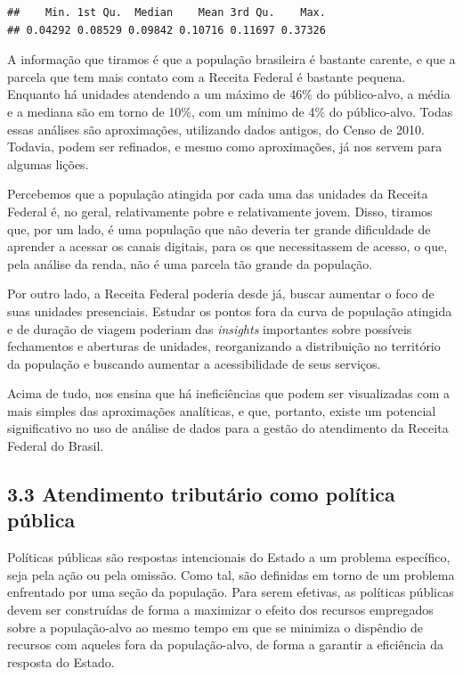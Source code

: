 \documentclass[]{article}
\begin{document}
\begin{verbatim}
##    Min. 1st Qu.  Median    Mean 3rd Qu.    Max. 
## 0.04292 0.08529 0.09842 0.10716 0.11697 0.37326
\end{verbatim}

A informação que tiramos é que a população brasileira é bastante
carente, e que a parcela que tem mais contato com a Receita Federal é
bastante pequena. Enquanto há unidades atendendo a um máximo de 46\% do
público-alvo, a média e a mediana são em torno de 10\%, com um mínimo de
4\% do público-alvo. Todas essas análises são aproximações, utilizando
dados antigos, do Censo de 2010. Todavia, podem ser refinados, e mesmo
como aproximações, já nos servem para algumas lições.

Percebemos que a população atingida por cada uma das unidades da Receita
Federal é, no geral, relativamente pobre e relativamente jovem. Disso,
tiramos que, por um lado, é uma população que não deveria ter grande
dificuldade de aprender a acessar os canais digitais, para os que
necessitassem de acesso, o que, pela análise da renda, não é uma parcela
tão grande da população.

Por outro lado, a Receita Federal poderia desde já, buscar aumentar o
foco de suas unidades presenciais. Estudar os pontos fora da curva de
população atingida e de duração de viagem poderiam das \emph{insights}
importantes sobre possíveis fechamentos e aberturas de unidades,
reorganizando a distribuição no território da população e buscando
aumentar a acessibilidade de seus serviços.

Acima de tudo, nos ensina que há ineficiências que podem ser
visualizadas com a mais simples das aproximações analíticas, e que,
portanto, existe um potencial significativo no uso de análise de dados
para a gestão do atendimento da Receita Federal do Brasil.

\hypertarget{atendimento-tributario-como-politica-publica}{%
\subsection{3.3 Atendimento tributário como política
pública}\label{atendimento-tributario-como-politica-publica}}

Políticas públicas são respostas intencionais do Estado a um problema
específico, seja pela ação ou pela omissão. Como tal, são definidas em
torno de um problema enfrentado por uma seção da população. Para serem
efetivas, as políticas públicas devem ser construídas de forma a
maximizar o efeito dos recursos empregados sobre a população-alvo ao
mesmo tempo em que se minimiza o dispêndio de recursos com aqueles fora
da população-alvo, de forma a garantir a eficiência da resposta do
Estado.
\end{document}
